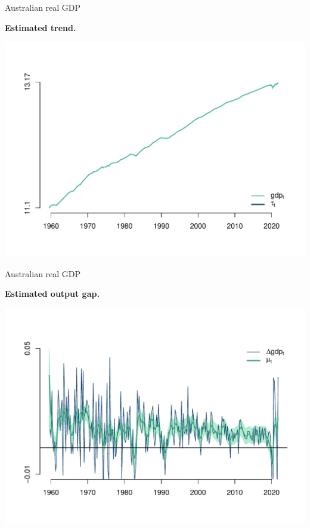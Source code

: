 \documentclass[notes,blackandwhite,mathsans,usenames,dvipsnames]{beamer}
\begin{document}
\begin{frame}{Australian real GDP}

\centering
\smallskip\textbf{Estimated trend.}

\includegraphics[scale=0.65, trim=2cm 0.5cm 2cm 2cm]{results/gdp-uc-tvpdrift-tau.pdf}

\end{frame}




\begin{frame}{Australian real GDP}

\centering
\smallskip\textbf{Estimated output gap.}

\includegraphics[scale=0.65, trim=2cm 0.5cm 2cm 2cm]{results/gdp-uc-tvpdrift-mu.pdf}

\end{frame}
\end{document}
